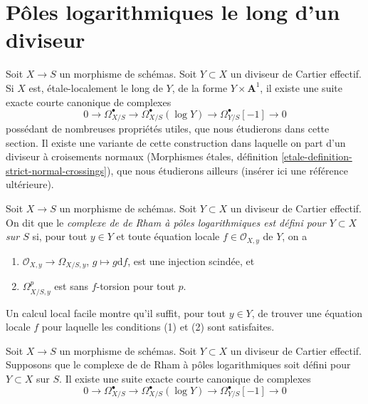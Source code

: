 \section{Pôles logarithmiques le long d'un diviseur}
\label{section-divisor}

\noindent
Soit $X \to S$ un morphisme de schémas. Soit $Y \subset X$ un
diviseur de Cartier effectif. Si $X$ est, étale-localement le long de $Y$,
de la forme $Y \times \mathbf{A}^1$, il existe une suite exacte courte canonique
de complexes
$$
0 \to \Omega^\bullet_{X/S} \to
\Omega^\bullet_{X/S}(\log Y) \to
\Omega^\bullet_{Y/S}[-1] \to 0
$$
possédant de nombreuses propriétés utiles, que nous étudierons dans cette section. Il existe une
variante de cette construction dans laquelle on part d'un diviseur à croisements
normaux
(Morphismes étales, définition \ref{etale-definition-strict-normal-crossings}),
que nous étudierons ailleurs (insérer ici une référence ultérieure).

\begin{definition}
\label{definition-local-product}
Soit $X \to S$ un morphisme de schémas. Soit $Y \subset X$ un
diviseur de Cartier effectif. On dit que le
{\it complexe de de Rham à pôles logarithmiques est défini pour $Y \subset X$ sur $S$}
si, pour tout $y \in Y$ et toute équation locale $f \in \mathcal{O}_{X, y}$
de $Y$, on a
\begin{enumerate}
\item $\mathcal{O}_{X, y} \to \Omega_{X/S, y}$, $g \mapsto g \text{d}f$,
est une injection scindée, et
\item $\Omega^p_{X/S, y}$ est sans $f$-torsion pour tout $p$.
\end{enumerate}
\end{definition}

\noindent
Un calcul local facile montre qu'il suffit, pour tout $y \in Y$,
de trouver une équation locale $f$ pour laquelle les conditions (1) et (2) sont satisfaites.

\begin{lemma}
\label{lemma-log-complex}
Soit $X \to S$ un morphisme de schémas. Soit $Y \subset X$ un
diviseur de Cartier effectif.
Supposons que le complexe de de Rham à pôles logarithmiques soit défini pour $Y \subset X$ sur $S$.
Il existe une suite exacte courte canonique
de complexes
$$
0 \to \Omega^\bullet_{X/S} \to
\Omega^\bullet_{X/S}(\log Y) \to
\Omega^\bullet_{Y/S}[-1] \to 0
$$
\end{lemma}

